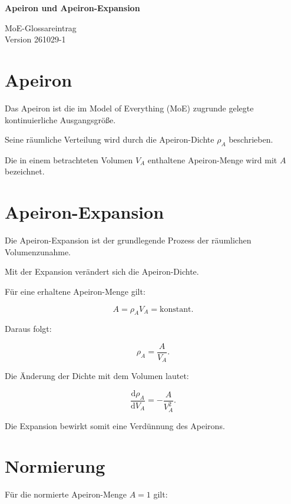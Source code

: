 \documentclass[11pt,a4paper]{article}
\begin{document}
\vspace*{-1.8cm}

\noindent
\begin{minipage}[t]{0.66\textwidth}
{\LARGE\bfseries Apeiron und
Apeiron-Expansion}
\end{minipage}
\hfill
\begin{minipage}[t]{0.30\textwidth}
\raggedleft
{\small MoE-Glossareintrag}\\
{\small Version 261029-1}
\end{minipage}

\vspace{1.4em}

\section*{Apeiron}

Das Apeiron ist die im Model of
Everything (MoE) zugrunde gelegte
kontinuierliche Ausgangsgröße.

Seine räumliche Verteilung wird
durch die Apeiron-Dichte
$\rho_A$ beschrieben.

Die in einem betrachteten Volumen
$V_A$ enthaltene Apeiron-Menge
wird mit $A$ bezeichnet.

\section*{Apeiron-Expansion}

Die Apeiron-Expansion ist der
grundlegende Prozess der
räumlichen Volumenzunahme.

Mit der Expansion verändert
sich die Apeiron-Dichte.

Für eine erhaltene Apeiron-Menge
gilt:

\[
A=\rho_A V_A=\mathrm{konstant}.
\]

Daraus folgt:

\[
\rho_A=\frac{A}{V_A}.
\]

Die Änderung der Dichte mit
dem Volumen lautet:

\[
\frac{\mathrm{d}\rho_A}
{\mathrm{d}V_A}
=
-\frac{A}{V_A^2}.
\]

Die Expansion bewirkt somit
eine Verdünnung des Apeirons.

\section*{Normierung}

Für die normierte Apeiron-Menge
$A=1$ gilt:
\end{document}
